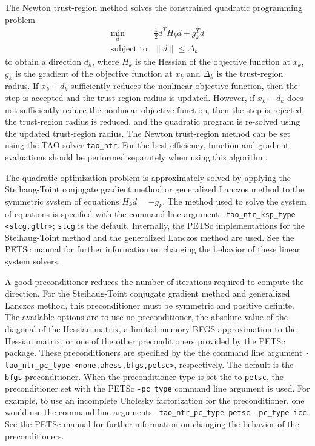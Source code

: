 The Newton trust-region method solves the constrained quadratic programming
problem
\[
\begin{array}{ll}
\min_d  & \frac{1}{2}d^T H_k d  + g_k^T d \\
\mbox{subject to} & \|d\| \leq \Delta_k
\end{array}
\]
to obtain a direction $d_k$, where $H_k$ is the Hessian of the objective 
function at $x_k$, $g_k$ is the gradient of the objective function at $x_k$ 
and $\Delta_k$ is the trust-region radius.  If $x_k + d_k$ sufficiently 
reduces the nonlinear objective function, then the step is accepted and the 
trust-region radius is updated.  However, if $x_k + d_k$ does not sufficiently
reduce the nonlinear objective function, then the step is rejected, the 
trust-region radius is reduced, and the quadratic program is re-solved 
using the updated trust-region radius. The Newton trust-region method 
can be set using the TAO solver {\tt tao\_ntr}.  For the best efficiency, 
function and gradient evaluations should be performed separately when 
using this algorithm.

The quadratic optimization problem is approximately solved by applying
the Steihaug-Toint conjugate gradient method or generalized Lanczos 
method to the symmetric system of equations $H_k d = -g_k$.  The method 
used to solve the system of equations is specified with the command line
argument {\tt -tao\_ntr\_ksp\_type <stcg,gltr>}; {\tt stcg} is the default.  
Internally, the PETSc implementations for the Steihaug-Toint method and the 
generalized Lanczos method are used.  See the PETSc manual for further 
information on changing the behavior of these linear system solvers.  

A good preconditioner reduces the number of iterations required to
compute the direction.  For the Steihaug-Toint conjugate gradient
method and generalized Lanczos method, this preconditioner must be
symmetric and positive definite.  The available options are to use no
preconditioner, the absolute value of the diagonal of the Hessian
matrix, a limited-memory BFGS approximation to the Hessian matrix, or
one of the other preconditioners provided by the PETSc package.  These
preconditioners are specified by the the command line argument 
{\tt -tao\_ntr\_pc\_type <none,ahess,bfgs,petsc>}, respectively.  The
default is the {\tt bfgs} preconditioner.  When the preconditioner
type is set the to {\tt petsc}, the preconditioner set with the PETSc
{\tt -pc\_type} command line argument is used.  For example, to use an
incomplete Cholesky factorization for the preconditioner, one would
use the command line arguments 
{\tt -tao\_ntr\_pc\_type petsc -pc\_type icc}.  See the PETSc manual 
for further information on changing the behavior of the preconditioners.

